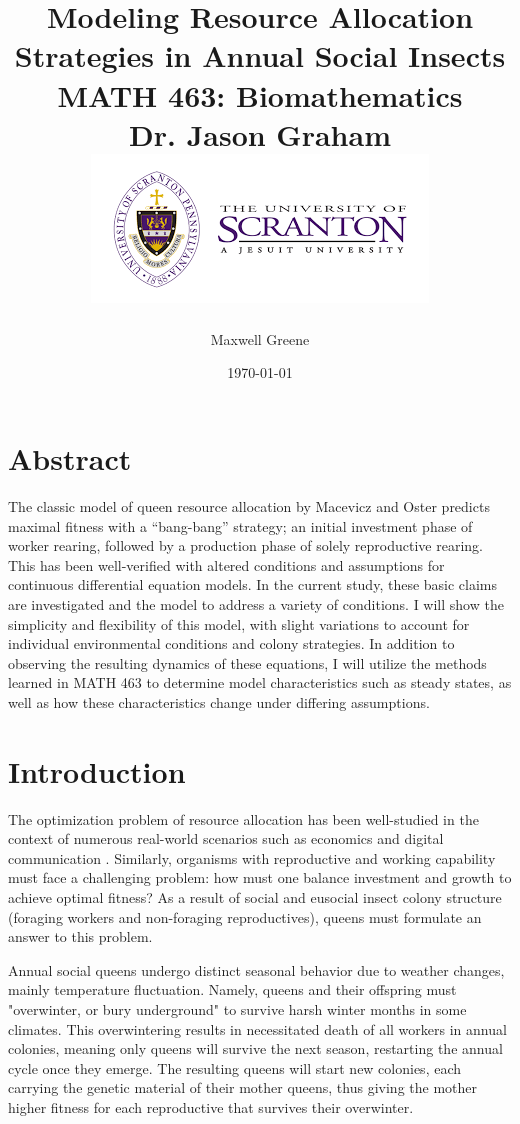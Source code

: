 \documentclass[12pt]{report}
\title
{
{Modeling Resource Allocation Strategies in Annual Social Insects}\\
{\large MATH 463: Biomathematics}\\
{\large Dr. Jason Graham} \\
{\includegraphics{university.png}}
}
\author{Maxwell Greene}
\date{\today}
\begin{document}



\maketitle

\tableofcontents
\listoffigures
{}

\chapter*{Abstract}

The classic model of queen resource allocation by Macevicz and Oster predicts maximal fitness with a “bang-bang” strategy; an initial investment phase of worker rearing, followed by a production phase of solely reproductive rearing. This has been well-verified with altered conditions and assumptions for continuous differential equation models. In the current study, these basic claims are investigated and the model to address a variety of conditions. I will show the simplicity and flexibility of this model, with slight variations to account for individual environmental conditions and colony strategies. In addition to observing the resulting dynamics of these equations, I will utilize the methods learned in MATH 463 to determine model characteristics such as steady states, as well as how these characteristics change under differing assumptions.


\chapter*{Introduction}

The optimization problem of resource allocation has been well-studied in the context of numerous real-world scenarios such as economics \cite{harberger1995monopoly} and digital communication \cite{hui1988resource}. Similarly, organisms with reproductive and working capability must face a challenging problem: how must one balance investment and growth to achieve optimal fitness? As a result of social and eusocial insect colony structure (foraging workers and non-foraging reproductives), queens must formulate an answer to this problem. 

Annual social queens undergo distinct seasonal behavior due to weather changes, mainly temperature fluctuation. Namely, queens and their offspring must "overwinter, or bury underground" to survive harsh winter months in some climates. This overwintering results in necessitated death of all workers in annual colonies, meaning only queens will survive the next season, restarting the annual cycle once they emerge. The resulting queens will start new colonies, each carrying the genetic material of their mother queens, thus giving the mother higher fitness for each reproductive that survives their overwinter.
\end{document}
